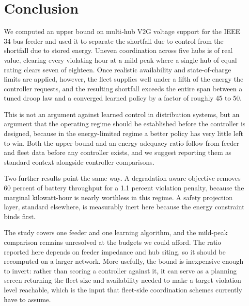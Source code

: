 \documentclass[conference,a4paper]{IEEEtran}
\begin{document}
\section{Conclusion}
\label{sec:conc}

We computed an upper bound on multi-hub V2G voltage support for the IEEE 34-bus feeder and used
it to separate the shortfall due to control from the shortfall due to stored energy. Uneven
coordination across five hubs is of real value, clearing every violating hour at a mild peak
where a single hub of equal rating clears seven of eighteen. Once realistic availability and
state-of-charge limits are applied, however, the fleet supplies well under a fifth of the energy
the controller requests, and the resulting shortfall exceeds the entire span between a tuned
droop law and a converged learned policy by a factor of roughly 45 to 50.

This is not an argument against learned control in distribution systems, but an argument that
the operating regime should be established before the controller is designed, because in the
energy-limited regime a better policy has very little left to win. Both the upper bound and an
energy adequacy ratio follow from feeder and fleet data before any controller exists, and we
suggest reporting them as standard context alongside controller comparisons.

Two further results point the same way. A degradation-aware objective removes 60 percent of
battery throughput for a 1.1 percent violation penalty, because the marginal kilowatt-hour is
nearly worthless in this regime. A safety projection layer, standard elsewhere, is measurably
inert here because the energy constraint binds first.

The study covers one feeder and one learning algorithm, and the mild-peak comparison remains
unresolved at the budgets we could afford. The ratio reported here depends on feeder impedance
and hub siting, so it should be recomputed on a larger network. More usefully, the bound is
inexpensive enough to invert: rather than scoring a controller against it, it can serve as a
planning screen returning the fleet size and availability needed to make a target violation
level reachable, which is the input that fleet-side coordination schemes \cite{chen2025}
currently have to assume.
\end{document}
